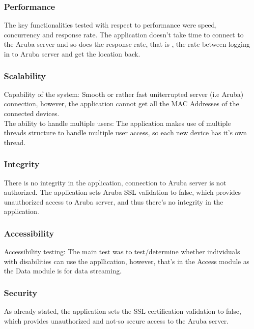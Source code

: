 			\subsubsection{Performance}
			The key functionalities tested with respect to performance were speed, concurrency and response rate. The application doesn't take time to connect to
			the Aruba server and so does the response rate, that is , the rate between logging in to Aruba server and get the location back.
			
			\subsubsection{Scalability}
			Capability of the system: Smooth or rather fast uniterrupted  server (i.e Aruba) connection, however, the application cannot get all the MAC Addresses of
			the connected devices. \\
			The ability to handle multiple users: The application makes use of multiple threads structure to handle multiple user access, so each new device has it's own thread.

			\subsubsection{Integrity}
			There is no integrity in the application, connection to Aruba server is not authorized. The application sets Aruba SSL validation to false, which provides unauthorized
			access to Aruba server, and thus there's no integrity in the application.

			\subsubsection{Accessibility}
			Accessibility testing: The main test was to test/determine whether individuals with disabilities can use the appllication, however, that's in the Access module as the Data
			module is for data streaming.

			\subsubsection{Security}
			As already stated, the application sets the SSL certification validation to false, which provides unauthorized and not-so secure access to the Aruba server.
